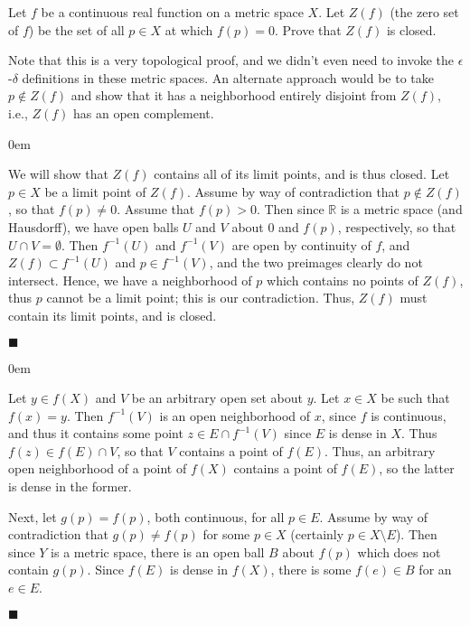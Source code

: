 \documentclass[12pt]{article}
\renewcommand{\qed}{\hfill$\blacksquare$}
\renewenvironment{proof}{\begin{addmargin}[1em]{0em}\begin{newproof}}{\end{newproof}\end{addmargin}\qed}
\newenvironment{problem}[2][Exercise]{\begin{trivlist}
\item[\hskip \labelsep {\bfseries #1}\hskip \labelsep {\bfseries #2.}]}{\end{trivlist}}
\begin{document}
\begin{problem}{4.3}
Let $f$ be a continuous real function on a metric space $X$. Let $Z\left(f\right)$ (the zero set of $f$) be the set of all $p\in X$ at which $f\left(p\right)=0$. Prove that $Z\left(f\right)$ is closed.
\end{problem}
{\color{red} Note that this is a very topological proof, and we didn't even need to invoke the $\epsilon$-$\delta$ definitions in these metric spaces. An alternate approach would be to take $p\notin Z\left(f\right)$ and show that it has a neighborhood entirely disjoint from $Z\left(f\right)$, i.e., $Z\left(f\right)$ has an open complement.}
\begin{proof}
We will show that $Z\left(f\right)$ contains all of its limit points, and is thus closed. Let $p\in X$ be a limit point of $Z\left(f\right)$. Assume by way of contradiction that $p \notin Z\left(f\right)$, so that $f\left(p\right) \neq 0$. Assume that $f\left(p\right)>0$. Then since $\mathbb{R}$ is a metric space (and Hausdorff), we have open balls $U$ and $V$ about $0$ and $f\left(p\right)$, respectively, so that $U\cap V = \emptyset$. Then $f^{-1}\left(U\right)$ and $f^{-1}\left(V\right)$ are open by continuity of $f$, and $Z\left(f\right)\subset f^{-1}\left(U\right)$ and $p \in f^{-1}\left(V\right)$, and the two preimages clearly do not intersect. Hence, we have a neighborhood of $p$ which contains no points of $Z\left(f\right)$, thus $p$ cannot be a limit point; this is our contradiction. Thus, $Z\left(f\right)$ must contain its limit points, and is closed.
\end{proof}



\begin{problem}{4.4}

\end{problem}
\begin{proof}
Let $y\in f\left(X\right)$ and $V$ be an arbitrary open set about $y$. Let $x\in X$ be such that $f\left(x\right)=y$. Then $f^{-1}\left(V\right)$ is an open neighborhood of $x$, since $f$ is continuous, and thus it contains some point $z \in E\cap f^{-1}\left(V\right)$ since $E$ is dense in $X$. Thus $f\left(z\right) \in f\left(E\right)\cap V$, so that $V$ contains a point of $f\left(E\right)$. Thus, an arbitrary open neighborhood of a point of $f\left(X\right)$ contains a point of $f\left(E\right)$, so the latter is dense in the former.

Next, let $g\left(p\right) = f\left(p\right)$, both continuous, for all $p\in E$. Assume by way of contradiction that $g\left(p\right) \neq f\left(p\right)$ for some $p \in X$ (certainly $p\in X\setminus E$). Then since $Y$ is a metric space, there is an open ball $B$ about $f\left(p\right)$ which does not contain $g\left(p\right)$. Since $f\left(E\right)$ is dense in $f\left(X\right)$, there is some $f\left(e\right)\in B$ for an $e\in E$.
\end{proof}
\end{document}
